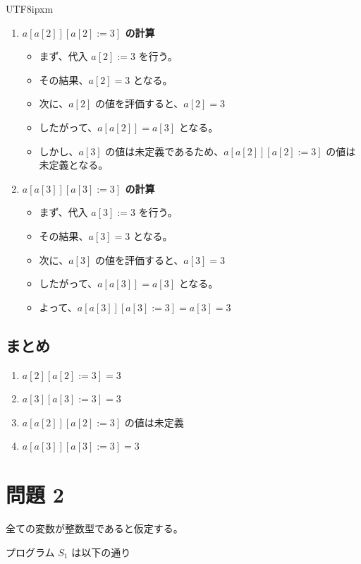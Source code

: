 \documentclass[12pt,a4paper]{article}
\begin{document}
\begin{CJK}{UTF8}{ipxm}
\begin{enumerate}
    \item \textbf{$a[a[2]][a[2] := 3]$ の計算}
    
    \begin{itemize}
        \item まず、代入 $a[2] := 3$ を行う。
        \item その結果、$a[2] = 3$ となる。
        \item 次に、$a[2]$ の値を評価すると、$a[2] = 3$
        \item したがって、$a[a[2]] = a[3]$ となる。
        \item しかし、$a[3]$ の値は未定義であるため、$a[a[2]][a[2] := 3]$ の値は未定義となる。
    \end{itemize}
    
    \item \textbf{$a[a[3]][a[3] := 3]$ の計算}
    
    \begin{itemize}
        \item まず、代入 $a[3] := 3$ を行う。
        \item その結果、$a[3] = 3$ となる。
        \item 次に、$a[3]$ の値を評価すると、$a[3] = 3$
        \item したがって、$a[a[3]] = a[3]$ となる。
        \item よって、$a[a[3]][a[3] := 3] = a[3] = 3$
    \end{itemize}
\end{enumerate}

\subsection*{まとめ}

\begin{enumerate}
    \item $a[2][a[2] := 3] = 3$
    \item $a[3][a[3] := 3] = 3$
    \item $a[a[2]][a[2] := 3]$ の値は未定義
    \item $a[a[3]][a[3] := 3] = 3$
\end{enumerate}

\section*{問題 2}

全ての変数が整数型であると仮定する。

プログラム $S_1$ は以下の通り


\end{CJK}
\end{document}
